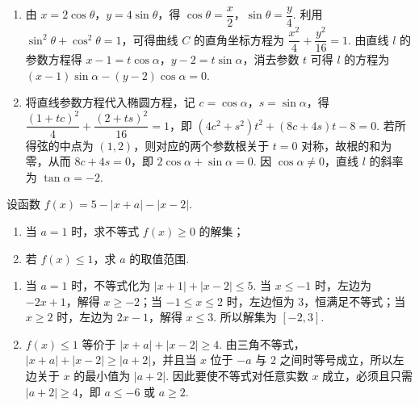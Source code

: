 \begin{solution}
\begin{enumerate}
\item 由 \(x=2\cos\theta\)，\(y=4\sin\theta\)，得 \(\cos\theta=\dfrac x2\)，\(\sin\theta=\dfrac y4\). 利用 \(\sin^2\theta+\cos^2\theta=1\)，可得曲线 \(C\) 的直角坐标方程为 \(\dfrac{x^2}{4}+\dfrac{y^2}{16}=1\). 由直线 \(l\) 的参数方程得 \(x-1=t\cos\alpha\)，\(y-2=t\sin\alpha\)，消去参数 \(t\) 可得 \(l\) 的方程为 \((x-1)\sin\alpha-(y-2)\cos\alpha=0\).
\item 将直线参数方程代入椭圆方程，记 \(c=\cos\alpha\)，\(s=\sin\alpha\)，得
\(\dfrac{(1+tc)^2}{4}+\dfrac{(2+ts)^2}{16}=1\)，即 \((4c^2+s^2)t^2+(8c+4s)t-8=0\). 若所得弦的中点为 \((1,2)\)，则对应的两个参数根关于 \(t=0\) 对称，故根的和为零，从而 \(8c+4s=0\)，即 \(2\cos\alpha+\sin\alpha=0\). 因 \(\cos\alpha\ne0\)，直线 \(l\) 的斜率为 \(\tan\alpha=-2\).
\end{enumerate}
\end{solution}

\begin{problem}
设函数 \(f(x)=5-\lvert x+a\rvert-\lvert x-2\rvert\).

\begin{enumerate}
    \item 当 \(a=1\) 时，求不等式 \(f(x)\ge0\) 的解集；
    \item 若 \(f(x)\le1\)，求 \(a\) 的取值范围.
\end{enumerate}
\end{problem}

\begin{solution}
\begin{enumerate}
\item 当 \(a=1\) 时，不等式化为 \(\lvert x+1\rvert+\lvert x-2\rvert\le5\). 当 \(x\le-1\) 时，左边为 \(-2x+1\)，解得 \(x\ge-2\)；当 \(-1\le x\le2\) 时，左边恒为 \(3\)，恒满足不等式；当 \(x\ge2\) 时，左边为 \(2x-1\)，解得 \(x\le3\). 所以解集为 \([-2,3]\).
\item \(f(x)\le1\) 等价于 \(\lvert x+a\rvert+\lvert x-2\rvert\ge4\). 由三角不等式，\(\lvert x+a\rvert+\lvert x-2\rvert\ge\lvert a+2\rvert\)，并且当 \(x\) 位于 \(-a\) 与 \(2\) 之间时等号成立，所以左边关于 \(x\) 的最小值为 \(\lvert a+2\rvert\). 因此要使不等式对任意实数 \(x\) 成立，必须且只需 \(\lvert a+2\rvert\ge4\)，即 \(a\le-6\) 或 \(a\ge2\).
\end{enumerate}
\end{solution}
